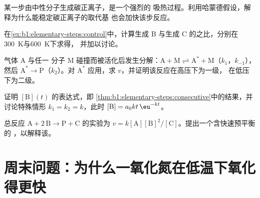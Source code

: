 \begin{exercise}[$\star\star$]\label{exo:b1:elementary-steps:8}
某一步由中性分子生成碳正离子，是一个强烈的
吸热过程。利用哈蒙德假设，解释为什么能稳定碳正离子的取代基
也会加快该步反应。
\end{exercise}

\begin{exercise}[$\star\star$]\label{exo:b1:elementary-steps:9}
在\cref{ex:b1:elementary-steps:control}中，计算生成 B 与生成 C 的之比，分别在\qty{300}{K}与\qty{600}{K}下求得，
并加以讨论。
\end{exercise}

\begin{exercise}[$\star\star\star$]\label{exo:b1:elementary-steps:10}
气体 $\mathrm{A}$ 与任一
分子 $\mathrm{M}$ 碰撞而被活化后发生分解：$\mathrm{A} + \mathrm{M} \rightleftharpoons
\mathrm{A}^* + \mathrm{M}$（$k_1$，$k_{-1}$），然后 $\mathrm{A}^* \to
\mathrm{P}$（$k_2$）。对
$\mathrm{A}^*$ 应用，求 $v$，并证明该反应在高压下为一级，
在低压下为二级。
\end{exercise}

\begin{exercise}[$\star\star\star$]\label{exo:b1:elementary-steps:11}
证明 $[\mathrm{B}](t)$ 的表达式，即
\cref{thm:b1:elementary-steps:consecutive}中的结果，并讨论特殊情形
$k_1 = k_2 = k$，此时 $[\mathrm{B}] = a_0kt\,\eu^{-kt}$。
\end{exercise}

\begin{exercise}[$\star\star\star$]\label{exo:b1:elementary-steps:12}
总反应 $\mathrm{A} + 2\,\mathrm{B} \to \mathrm{P} +
\mathrm{C}$ 的实验为 $v =
k[\mathrm{A}][\mathrm{B}]^2/[\mathrm{C}]$。提出一个含快速预平衡的
，以解释该。
\end{exercise}

\section{周末问题：为什么一氧化氮在低温下氧化得更快}

